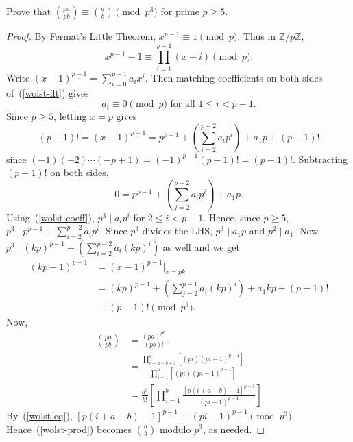\begin{thm}[Wolstenholme]
Prove that $\binom{pa}{pb}\equiv \binom{a}{b}\pmod{p^3}$ for prime $p\geq 5$.
\end{thm}
\begin{proof}
By Fermat's Little Theorem, $x^{p-1}\equiv 1\pmod{p}$. Thus in $\mathbb{Z}/p\mathbb{Z}$, \begin{equation}
x^{p-1}-1\equiv \prod_{i=1}^{p-1} (x-i)\pmod{p}.\label{wolst-flt}
\end{equation}
Write $(x-1)^{\underline{p-1}}=\sum_{i=0}^{p-1} a_ix^i$. Then matching coefficients on both sides of~(\ref{wolst-flt}) gives
\begin{equation}
a_i\equiv 0\pmod{p}\text{ for all }1\leq i<p-1.
\label{wolst-coeff}
\end{equation}
Since $p\geq 5$, letting $x=p$ gives
\[(p-1)!=(x-1)^{\underline{p-1}}=p^{p-1}+\left(\sum_{i=2}^{p-2} a_ip^i\right)+a_1p+(p-1)!\]
since $(-1)(-2)\cdots (-p+1)=(-1)^{p-1}(p-1)!=(p-1)!$. Subtracting $(p-1)!$ on both sides,
\[0=p^{p-1}+\left(\sum_{j=2}^{p-2} a_ip^i\right)+a_1p.\]
Using~(\ref{wolst-coeff}), $p^3\mid a_ip^i$ for $2\leq i<p-1$. Hence, since $p\geq 5$, $p^3\mid p^{p-1} +\sum_{i=2}^{p-2} a_ip^i$. Since $p^3$ divides the LHS, $p^3\mid a_1p$ and $p^2\mid a_1$. Now  $p^3\mid(kp)^{p-1}+\left( \sum_{i=2}^{p-2} a_i (kp)^i \right)$ as well and we get
\begin{align}
\nonumber(kp-1)^{\underline{p-1}}&=(x-1)^{\underline{p-1}}|_{x=pk}\\
\nonumber&=(kp)^{p-1}+\left(\sum_{j=2}^{p-1} a_i(kp)^i\right)+a_1kp+(p-1)!\\
&\equiv (p-1)!\pmod{p^3}.\label{wolst-eq}
\end{align}
Now,
\begin{align}
\nonumber\binom{pa}{pb}
&=\frac{(pa)^{\underline{pb}}}{(pb)!}\\
\nonumber&=\frac{\prod_{i=a-b+1}^{a}[(pi)(pi-1)^{\underline{p-1}}]}{\prod_{i=1}^b [(pi)(pi-1)^{\underline{p-1}}]}\\
&=\frac{a^{\underline{b}}}{b!} \left[\prod_{i=1}^b \frac{[p(i+a-b)-1]^{\underline{p-1}}}{(pi-1)^{\underline{p-1}}}\right]\label{wolst-prod}
\end{align}
By~(\ref{wolst-eq}), $[p(i+a-b)-1]^{\underline{p-1}}\equiv (pi-1)^{\underline{p-1}}\pmod{p^3}$. Hence~(\ref{wolst-prod}) becomes $\binom{a}{b}$ modulo $p^3$, as needed.
\end{proof}

